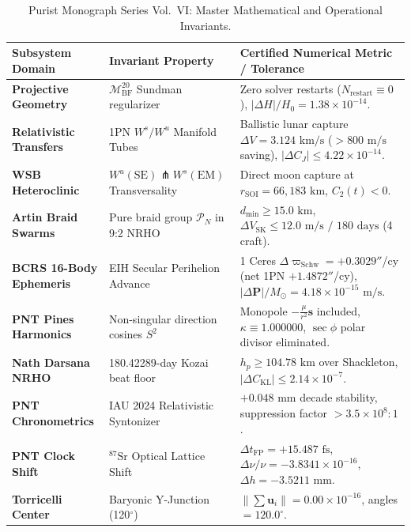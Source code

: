 \documentclass[11pt,a4paper,reqno]{article}
\theoremstyle{plain}
\theoremstyle{definition}
\theoremstyle{remark}
\numberwithin{equation}{section}
\newcommand{\MbfTwenty}{\mathcal{M}_{\mathrm{BF}}^{20}}
\begin{document}
\begin{table}[htbp]
\centering
\caption{Purist Monograph Series Vol.~VI: Master Mathematical and Operational Invariants.}
\label{tab:purist_vol6_invariants}
\footnotesize
\renewcommand{\arraystretch}{1.25}
\begin{tabularx}{\textwidth}{@{}P{3.4cm}P{4.2cm}Y@{}}
\toprule
\textbf{Subsystem Domain} & \textbf{Invariant Property} & \textbf{Certified Numerical Metric / Tolerance} \\
\midrule
\textbf{Projective Geometry} & $\MbfTwenty$ Sundman regularizer & Zero solver restarts ($N_{\mathrm{restart}} \equiv 0$), $|\Delta H|/H_0 = 1.38 \times 10^{-14}$. \\
\textbf{Relativistic Transfers} & 1PN $W^s/W^u$ Manifold Tubes & Ballistic lunar capture $\Delta V = 3.124\text{ km/s}$ ($> 800\text{ m/s}$ saving), $|\Delta C_J| \le 4.22 \times 10^{-14}$. \\
\textbf{WSB Heteroclinic} & $W^u(\mathrm{SE}) \pitchfork W^s(\mathrm{EM})$ Transversality & Direct moon capture at $r_{\mathrm{SOI}} = 66{,}183\text{ km}$, $C_2(t) < 0$. \\
\textbf{Artin Braid Swarms} & Pure braid group $\mathcal{P}_N$ in 9:2 NRHO & $d_{\min} \ge 15.0\text{ km}$, $\Delta V_{\mathrm{SK}} \le 12.0\text{ m/s / 180 days}$ (4 craft). \\
\textbf{BCRS 16-Body Ephemeris} & EIH Secular Perihelion Advance & 1 Ceres $\Delta \varpi_{\mathrm{Schw}} = +0.3029''$/cy (net 1PN $+1.4872''$/cy), $|\Delta \mathbf{P}|/M_\odot = 4.18 \times 10^{-15}\text{ m/s}$. \\
\textbf{PNT Pines Harmonics} & Non-singular direction cosines $S^2$ & Monopole $-\frac{\mu}{r^2}\mathbf{s}$ included, $\kappa \equiv 1.000000$, $\sec\phi$ polar divisor eliminated. \\
\textbf{Nath Darsana NRHO} & 180.42289-day Kozai beat floor & $h_p \ge 104.78\text{ km}$ over Shackleton, $|\Delta C_{\mathrm{KL}}| \le 2.14 \times 10^{-7}$. \\
\textbf{PNT Chronometrics} & IAU 2024 Relativistic Syntonizer & $+0.048\text{ mm}$ decade stability, suppression factor $> 3.5 \times 10^8 : 1$. \\
\textbf{PNT Clock Shift} & $^{87}\text{Sr}$ Optical Lattice Shift & $\Delta t_{\mathrm{FP}} = +15.487\text{ fs}$, $\Delta \nu/\nu = -3.8341 \times 10^{-16}$, $\Delta h = -3.5211\text{ mm}$. \\
\textbf{Torricelli Center} & Baryonic Y-Junction (120$^\circ$) & $\|\sum \mathbf{u}_i\| = 0.00 \times 10^{-16}$, angles $= 120.0^\circ$. \\

\end{tabularx}
\end{table}
\end{document}
